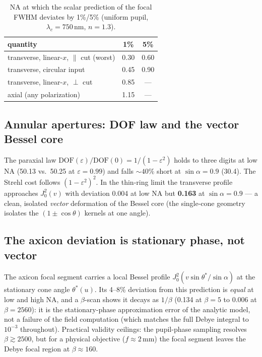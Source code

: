 \documentclass[11pt]{article}
\begin{document}
\begin{table}[htb]\centering\small
\caption{NA at which the scalar prediction of the focal FWHM deviates by
1\%/5\% (uniform pupil, $\lambda_c=750$\,nm, $n=1.3$).}
\label{tab:thresh}
\begin{tabular}{lcc}\toprule
quantity & 1\% & 5\% \\ \midrule
transverse, linear-$x$, $\parallel$ cut (worst) & 0.30 & 0.60\\
transverse, circular input & 0.45 & 0.90\\
transverse, linear-$x$, $\perp$ cut & 0.85 & ---\\
axial (any polarization) & 1.15 & ---\\ \bottomrule
\end{tabular}
\end{table}

\subsection{Annular apertures: DOF law and the vector Bessel core}
The paraxial law $\mathrm{DOF}(\varepsilon)/\mathrm{DOF}(0)=1/(1-\varepsilon^2)$
holds to three digits at low NA (50.13 vs.\ 50.25 at $\varepsilon=0.99$) and
falls ${\sim}40\%$ short at $\sin\alpha=0.9$ (30.4). The Strehl cost follows
$(1-\varepsilon^2)^2$. In the thin-ring limit the transverse profile approaches
$J_0^2(v)$ with deviation 0.004 at low NA but \textbf{0.163} at
$\sin\alpha=0.9$ --- a clean, isolated \emph{vector} deformation of the Bessel
core (the single-cone geometry isolates the $(1\pm\cos\theta)$ kernels at one
angle).

\subsection{The axicon deviation is stationary phase, not vector}
The axicon focal segment carries a local Bessel profile
$J_0^2(v\sin\theta^*/\sin\alpha)$ at the stationary cone angle
$\theta^*(u)$. Its 4--8\% deviation from this prediction is \emph{equal} at low
and high NA, and a $\beta$-scan shows it decays as $1/\beta$ (0.134 at
$\beta{=}5$ to 0.006 at $\beta{=}2560$): it is the stationary-phase
approximation error of the analytic model, not a failure of the field
computation (which matches the full Debye integral to $10^{-3}$ throughout).
Practical validity ceilings: the pupil-phase sampling resolves
$\beta\gtrsim2500$, but for a physical objective ($f\approx2$\,mm) the focal
segment leaves the Debye focal region at $\beta\approx160$.
\end{document}
